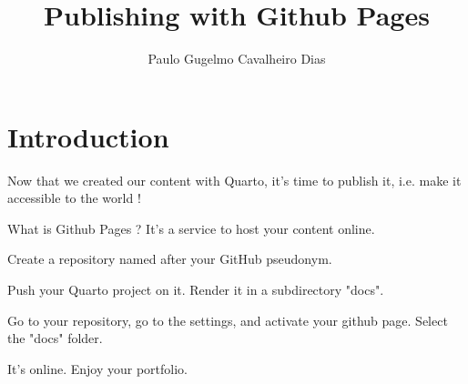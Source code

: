 \documentclass{beamer}
\title{Publishing with Github Pages}
\author{Paulo Gugelmo Cavalheiro Dias}
\begin{document}
\section{Introduction}

\begin{frame}
    Now that we created our content with Quarto, it's time to publish it, i.e. make it accessible to the world ! 
\end{frame}

\begin{frame}
    What is Github Pages ? It's a service to host your content online. 
\end{frame}

\begin{frame}
    Create a repository named after your GitHub pseudonym. 
\end{frame}

\begin{frame}
    Push your Quarto project on it. Render it in a subdirectory "docs".
\end{frame}

\begin{frame}
    Go to your repository, go to the settings, and activate your github page. 
    Select the "docs" folder.
\end{frame}

\begin{frame}
    It's online.
    Enjoy your portfolio. 
\end{frame}
\end{document}
